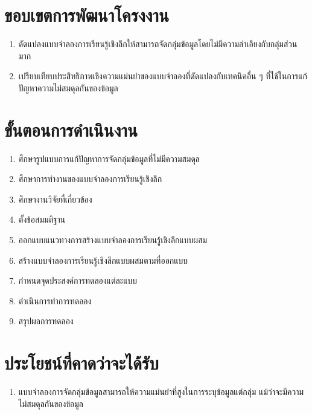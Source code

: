 \section{ขอบเขตการพัฒนาโครงงาน}
\begin{enumerate}
	\item ดัดแปลงแบบจำลองการเรียนรู้เชิงลึกให้สามารถจัดกลุ่มข้อมูลโดยไม่มีความลำเอียงกับกลุ่มส่วนมาก
	\item เปรียบเทียบประสิทธิภาพเชิงความแม่นยำของแบบจำลองที่ดัดแปลงกับเทคนิคอื่น ๆ ที่ใช้ในการแก้ปัญหาความไม่สมดุลกันของข้อมูล
\end{enumerate}
\section{ขั้นตอนการดำเนินงาน}
\begin{enumerate}
	\item ศึกษารูปแบบการแก้ปัญหาการจัดกลุ่มข้อมูลที่ไม่มีความสมดุล
	\item ศึกษาการทำงานของแบบจำลองการเรียนรู้เชิงลึก
	\item ศึกษางานวิจัยที่เกี่ยวข้อง
	\item ตั้งข้อสมมติฐาน
	\item ออกแบบแนวทางการสร้างแบบจำลองการเรียนรู้เชิงลึกแบบผสม
	\item สร้างแบบจำลองการเรียนรู้เชิงลึกแบบผสมตามที่ออกแบบ
	\item กำหนดจุดประสงค์การทดลองแต่ละแบบ
	\item ดำเนินการทำการทดลอง
	\item สรุปผลการทดลอง
\end{enumerate}
\section{ประโยชน์ที่คาดว่าจะได้รับ}
\begin{enumerate}
	\item แบบจำลองการจัดกลุ่มข้อมูลสามารถให้ความแม่นยำที่สูงในการระบุข้อมูลแต่กลุ่ม แม้ว่าจะมีความไม่สมดุลกันของข้อมูล
\end{enumerate}

